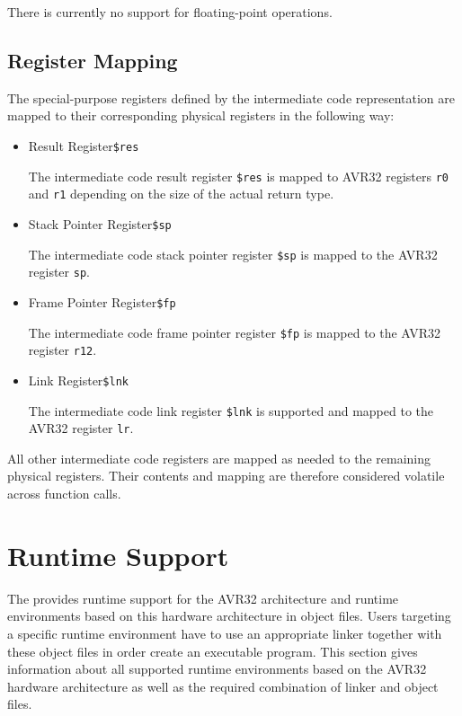There is currently no support for floating-point operations.

\subsection{Register Mapping}

The special-purpose registers defined by the intermediate code representation are mapped to their corresponding physical registers in the following way:

\begin{itemize}

\item Result Register\alignright\texttt{\$res}\nopagebreak

The intermediate code result register \texttt{\$res} is mapped to AVR32 registers \texttt{r0} and \texttt{r1} depending on the size of the actual return type.

\item Stack Pointer Register\alignright\texttt{\$sp}\nopagebreak

The intermediate code stack pointer register \texttt{\$sp} is mapped to the AVR32 register \texttt{sp}.

\item Frame Pointer Register\alignright\texttt{\$fp}\nopagebreak

The intermediate code frame pointer register \texttt{\$fp} is mapped to the AVR32 register \texttt{r12}.

\item Link Register\alignright\texttt{\$lnk}\nopagebreak

The intermediate code link register \texttt{\$lnk} is supported and mapped to the AVR32 register \texttt{lr}.

\end{itemize}

All other intermediate code registers are mapped as needed to the remaining physical registers.
Their contents and mapping are therefore considered volatile across function calls.

\section{Runtime Support}

The \ecs{} provides runtime support for the AVR32 architecture and runtime environments based on this hardware architecture in object files.
Users targeting a specific runtime environment have to use an appropriate linker together with these object files in order create an executable program.
This section gives information about all supported runtime environments based on the AVR32 hardware architecture as well as the required combination of linker and object files.

